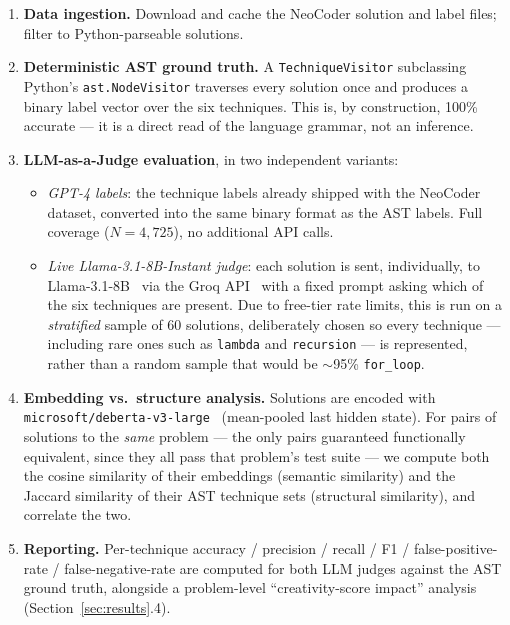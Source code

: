 \documentclass{article}
\begin{document}
\begin{enumerate}[label=\textbf{Phase \arabic*.}, leftmargin=2.2cm]
\item \textbf{Data ingestion.} Download and cache the NeoCoder solution and
  label files; filter to Python-parseable solutions.
\item \textbf{Deterministic AST ground truth.} A \texttt{TechniqueVisitor}
  subclassing Python's \texttt{ast.NodeVisitor} traverses every solution once
  and produces a binary label vector over the six techniques. This is, by
  construction, 100\% accurate --- it is a direct read of the language
  grammar, not an inference.
\item \textbf{LLM-as-a-Judge evaluation}, in two independent variants:
  \begin{itemize}
    \item \emph{GPT-4 labels}: the technique labels already shipped with the
      NeoCoder dataset, converted into the same binary format as the AST
      labels. Full coverage ($N = 4{,}725$), no additional API calls.
    \item \emph{Live Llama-3.1-8B-Instant judge}: each solution is sent,
      individually, to Llama-3.1-8B~\citep{llama3} via the Groq
      API~\citep{groq} with a fixed prompt
      asking which of the six techniques are present. Due to free-tier
      rate limits, this is run on a \emph{stratified} sample of 60
      solutions, deliberately chosen so every technique --- including rare
      ones such as \texttt{lambda} and \texttt{recursion} --- is represented,
      rather than a random sample that would be $\sim$95\% \texttt{for\_loop}.
  \end{itemize}
\item \textbf{Embedding vs.\ structure analysis.} Solutions are encoded with
  \texttt{microsoft/deberta-v3-large}~\citep{deberta} (mean-pooled last hidden state). For
  pairs of solutions to the \emph{same} problem --- the only pairs guaranteed
  functionally equivalent, since they all pass that problem's test suite ---
  we compute both the cosine similarity of their embeddings (semantic
  similarity) and the Jaccard similarity of their AST technique sets
  (structural similarity), and correlate the two.
\item \textbf{Reporting.} Per-technique accuracy / precision / recall / F1 /
  false-positive-rate / false-negative-rate are computed for both LLM judges
  against the AST ground truth, alongside a problem-level ``creativity-score
  impact'' analysis (Section~\ref{sec:results}.4).
\end{enumerate}
\end{document}
